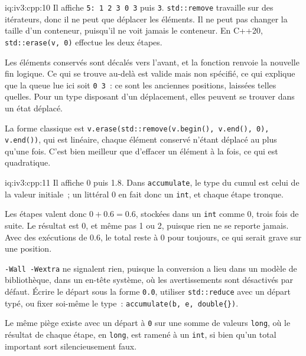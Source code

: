 \begin{solution}{iq:iv3:cpp:10}
Il affiche \texttt{5: 1 2 3 0 3} puis \texttt{3}. \texttt{std::remove} travaille sur des itérateurs, donc il ne peut que déplacer les éléments. Il ne peut pas changer la taille d'un conteneur, puisqu'il ne voit jamais le conteneur. En C++20, \texttt{std::erase(v, 0)} effectue les deux étapes.

Les éléments conservés sont décalés vers l'avant, et la fonction renvoie la nouvelle fin logique. Ce qui se trouve au-delà est valide mais non spécifié, ce qui explique que la queue lue ici soit \texttt{0 3}~: ce sont les anciennes positions, laissées telles quelles. Pour un type disposant d'un déplacement, elles peuvent se trouver dans un état déplacé.

La forme classique est \texttt{v.erase(std::remove(v.begin(), v.end(), 0), v.end())}, qui est linéaire, chaque élément conservé n'étant déplacé au plus qu'une fois. C'est bien meilleur que d'effacer un élément à la fois, ce qui est quadratique.

\end{solution}

\begin{solution}{iq:iv3:cpp:11}
Il affiche 0 puis 1.8. Dans \texttt{accumulate}, le type du cumul est celui de la valeur initiale~; un littéral 0 en fait donc un \texttt{int}, et chaque étape tronque.

Les étapes valent donc $0 + 0.6 = 0.6$, stockées dans un \texttt{int} comme 0, trois fois de suite. Le résultat est 0, et même pas 1 ou 2, puisque rien ne se reporte jamais. Avec des exécutions de 0.6, le total reste à 0 pour toujours, ce qui serait grave sur une position.

\texttt{-Wall -Wextra} ne signalent rien, puisque la conversion a lieu dans un modèle de bibliothèque, dans un en-tête système, où les avertissements sont désactivés par défaut. Écrire le départ sous la forme \texttt{0.0}, utiliser \texttt{std::reduce} avec un départ typé, ou fixer soi-même le type~: \texttt{accumulate(b, e, double\{\})}.

Le même piège existe avec un départ à \texttt{0} sur une somme de valeurs \texttt{long}, où le résultat de chaque étape, en \texttt{long}, est ramené à un \texttt{int}, si bien qu'un total important sort silencieusement faux.

\end{solution}


